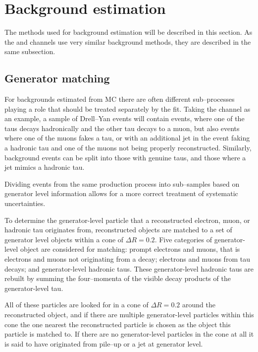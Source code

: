 \section{Background estimation}
\label{sec:mssm_bkgs}
The methods used for background estimation will be described in this
section. As the \mutau and \etau channels use very similar
background methods, they are described in the same subsection.

\subsection{Generator matching}
\label{sec:mssm_bkgs_genmatch}
For backgrounds estimated from \ac{MC} there are often 
different sub--processes playing a role that should be
treated separately by the fit. Taking the \mutau 
channel as an example, a sample of Drell--Yan events
will contain \Ztautau events, where one of the taus decays
hadronically and the other tau decays to a muon, but also
\Zmm events where one of the muons fakes a tau, or with an 
additional jet in the event faking a hadronic tau and one of the
muons not being properly reconstructed. Similarly, \ttbar background
events can be split into those with genuine taus, and those
where a jet mimics a hadronic tau.

Dividing events from the same production
process into sub--samples
based on generator level information allows
for a more correct treatment of systematic uncertainties. 

To determine the generator-level particle
that a reconstructed electron, muon, or hadronic tau
originates from, reconstructed objects are matched
to a set of generator level objects within a cone of $\Delta R = 0.2$.
Five categories of generator-level object are considered for matching:
prompt electrons and muons,
that is electrons and muons not originating from a decay; electrons and muons
from tau decays; and generator-level hadronic taus. These generator-level
hadronic taus are rebuilt by summing the four--momenta
of the visible decay products of the generator-level tau.

All of these particles are looked for in a cone of $\Delta R = 0.2$ around
the reconstructed object, and if there are multiple generator-level
particles within this cone the one nearest the reconstructed particle
is chosen as the object this particle is matched to. If there are no 
generator-level particles in the cone at all it is said to 
have originated from pile--up or a jet at generator level.

